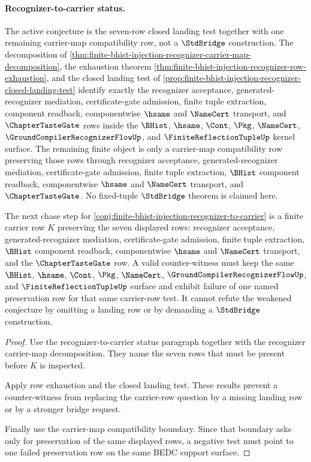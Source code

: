 \paragraph{Recognizer-to-carrier status.}
The active conjecture is the seven-row closed landing test together with one remaining carrier-map compatibility row, not a $\StdBridge$ construction. The decomposition of \autoref{thm:finite-bhist-injection-recognizer-carrier-map-decomposition}, the exhaustion theorem \autoref{thm:finite-bhist-injection-recognizer-row-exhaustion}, and the closed landing test of \autoref{prop:finite-bhist-injection-recognizer-closed-landing-test} identify exactly the recognizer acceptance, generated-recognizer mediation, certificate-gate admission, finite tuple extraction, component readback, componentwise $\hsame$ and $\NameCert$ transport, and $\ChapterTasteGate$ rows inside the $\BHist$, $\hsame$, $\Cont$, $\Pkg$, $\NameCert$, $\GroundCompilerRecognizerFlowUp$, and $\FiniteReflectionTupleUp$ kernel surface. The remaining finite object is only a carrier-map compatibility row preserving those rows through recognizer acceptance, generated-recognizer mediation, certificate-gate admission, finite tuple extraction, $\BHist$ component readback, componentwise $\hsame$ and $\NameCert$ transport, and $\ChapterTasteGate$. No fixed-tuple $\StdBridge$ theorem is claimed here.

\begin{theorem}
\label{thm:finite-bhist-injection-carrier-row-counter-witness-test}
The next chase step for \autoref{conj:finite-bhist-injection-recognizer-to-carrier} is a finite carrier row $K$ preserving the seven displayed rows: recognizer acceptance, generated-recognizer mediation, certificate-gate admission, finite tuple extraction, $\BHist$ component readback, componentwise $\hsame$ and $\NameCert$ transport, and the $\ChapterTasteGate$ row. A valid counter-witness must keep the same $\BHist$, $\hsame$, $\Cont$, $\Pkg$, $\NameCert$, $\GroundCompilerRecognizerFlowUp$, and $\FiniteReflectionTupleUp$ surface and exhibit failure of one named preservation row for that same carrier-row test. It cannot refute the weakened conjecture by omitting a landing row or by demanding a $\StdBridge$ construction.
\end{theorem}
\begin{proof}
Use the recognizer-to-carrier status paragraph together with the recognizer carrier-map decomposition. They name the seven rows that must be present before $K$ is inspected.

Apply row exhaustion and the closed landing test. These results prevent a counter-witness from replacing the carrier-row question by a missing landing row or by a stronger bridge request.

Finally use the carrier-map compatibility boundary. Since that boundary asks only for preservation of the same displayed rows, a negative test must point to one failed preservation row on the same BEDC support surface.
\end{proof}

